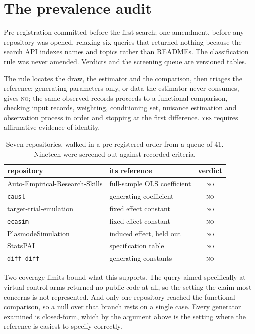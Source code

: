 \section{The prevalence audit}
\label{app:prevalence}

Pre-registration committed before the first search; one amendment, before any
repository was opened, relaxing six queries that returned nothing because the
search API indexes names and topics rather than READMEs. The classification rule
was never amended. Verdicts and the screening queue are versioned tables.

The rule locates the draw, the estimator and the comparison, then triages the
reference: generating parameters only, or data the estimator never consumes,
gives \textsc{no}; the same observed records proceeds to a functional
comparison, checking input records, weighting, conditioning set, nuisance
estimation and observation process in order and stopping at the first
difference. \textsc{yes} requires affirmative evidence of identity.

\begin{table}[htbp]
\small
\centering
\caption{Seven repositories, walked in a pre-registered order from a queue of
41. Nineteen were screened out against recorded criteria.}
\label{tab:prevalence}
\begin{tabular}{@{}llc@{}}
\toprule
repository & its reference & verdict \\
\midrule
Auto-Empirical-Research-Skills & full-sample OLS coefficient & \textsc{no} \\
\texttt{causl}                 & generating coefficient      & \textsc{no} \\
target-trial-emulation         & fixed effect constant       & \textsc{no} \\
\texttt{ecasim}                & fixed effect constant       & \textsc{no} \\
PlasmodeSimulation             & induced effect, held out    & \textsc{no} \\
StatsPAI                       & specification table         & \textsc{no} \\
\texttt{diff-diff}             & generating constants        & \textsc{no} \\
\bottomrule
\end{tabular}
\end{table}

Two coverage limits bound what this supports. The query aimed specifically at
virtual control arms returned no public code at all, so the setting the claim
most concerns is not represented. And only one repository reached the
functional comparison, so a null over that branch rests on a single case. Every
generator examined is closed-form, which by the argument above is the setting
where the reference is easiest to specify correctly.
